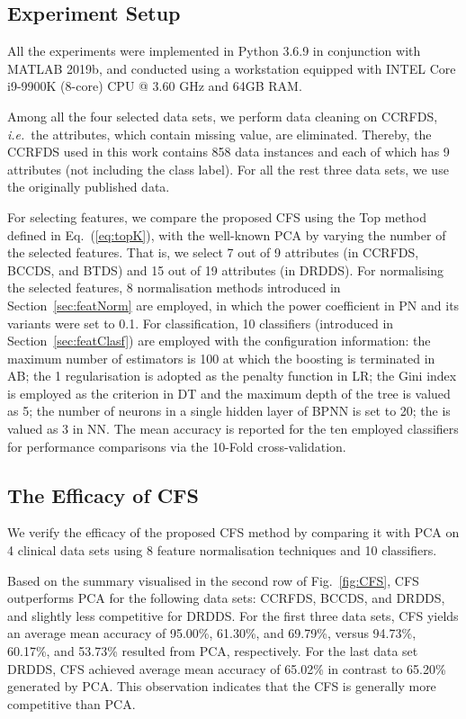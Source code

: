 \documentclass{article}
\newcommand{\zzie}{\emph{i.e.}~}
\newcommand*{\1}{\textcolor{red}}
\begin{document}
\subsection{Experiment Setup}
All the experiments were implemented in Python\textsuperscript{\texttrademark} 3.6.9 in conjunction with MATLAB\textsuperscript{\textregistered} 2019b, and conducted using a workstation equipped with INTEL\textsuperscript{\textregistered} Core\textsuperscript{\texttrademark} i9-9900K (8-core) CPU @ 3.60 GHz and 64GB RAM.

Among all the four selected data sets, we perform data cleaning on CCRFDS, \zzie the attributes, which contain missing value, are eliminated. Thereby, the CCRFDS used in this work contains 858 data instances and each of which has 9 attributes (not including the class label). For all the rest three data sets, we use the originally published data.

For selecting features, we compare the proposed CFS using the Top method defined in Eq.~(\ref{eq:topK}), with the well-known PCA by varying the number of the selected features. That is, we select 7 out of 9 attributes (in CCRFDS, BCCDS, and BTDS) and 15 out of 19 attributes (in DRDDS). For normalising the selected features, 8 normalisation methods introduced in Section~\ref{sec:featNorm} are employed, in which the power coefficient in PN and its variants were set to 0.1. For classification, 10 classifiers (introduced in Section~\ref{sec:featClasf}) are employed with the configuration information: the maximum number of estimators is 100 at which the boosting is terminated in AB; the 1 regularisation is adopted as the penalty function in LR; the Gini index is employed as the criterion in DT and the maximum depth of the tree is valued as 5; the number of neurons in a single hidden layer of BPNN is set to 20; the  is valued as 3 in NN. The mean accuracy is reported for the ten employed classifiers for performance comparisons via the 10-Fold cross-validation.

\subsection{The Efficacy of CFS}
We verify the efficacy of the proposed CFS method by comparing it with PCA on 4 clinical data sets using 8 feature normalisation techniques and 10 classifiers.

Based on the summary visualised in the second row of Fig.~\ref{fig:CFS}, CFS outperforms PCA for the following data sets: CCRFDS, BCCDS, and DRDDS, and slightly less competitive for DRDDS. For the first three data sets, CFS yields an average mean accuracy of 95.00\%, 61.30\%, and 69.79\%, versus 94.73\%, 60.17\%, and 53.73\% resulted from PCA, respectively. For the last data set DRDDS, CFS achieved average mean accuracy of 65.02\% in contrast to 65.20\% generated by PCA. This observation indicates that the CFS is generally more competitive than PCA.
\end{document}

